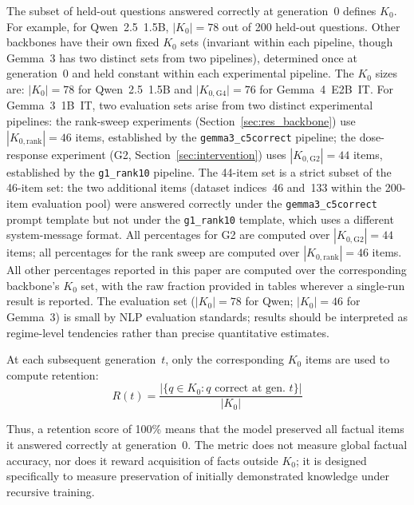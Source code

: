 \documentclass[a4paper,fleqn]{cas-dc}
\newif\ifshowchanges
\newcommand{\rev}[1]{\ifshowchanges{\color{blue}#1}\else{#1}\fi}
\newcommand{\Kcard}{\lvert K_0\rvert}
\newcommand{\KcardG}[1]{\lvert K_{0,\mathrm{#1}}\rvert}
\begin{document}
The subset of held-out questions answered correctly at generation~0 defines
$K_0$. For example, for Qwen~2.5~1.5B, $\Kcard=78$ out of 200 held-out
questions. Other backbones have their own fixed $K_0$ sets (invariant within each pipeline, though Gemma~3 has two distinct sets from two pipelines), determined once at
generation~0 and \rev{held constant within each experimental pipeline}.
\rev{The $K_0$ sizes are: $\Kcard=78$ for Qwen~2.5~1.5B and $\KcardG{G4}=76$ for
Gemma~4~E2B~IT. For Gemma~3~1B~IT, two evaluation sets arise from two distinct
experimental pipelines: the \rev{rank-sweep experiments}
(Section~\ref{sec:res_backbone}) use $|K_{0,\mathrm{rank}}|=46$ items, established
by the \texttt{gemma3\_c5correct} pipeline; the dose-response experiment (G2,
Section~\ref{sec:intervention}) uses $|K_{0,\mathrm{G2}}|=44$ items, established
by the \texttt{g1\_rank10} pipeline. The 44-item set is a strict subset of the
46-item set: the two additional items (dataset indices~46 and~133 within the
200-item evaluation pool) were answered correctly under the
\texttt{gemma3\_c5correct} prompt template but not under the \texttt{g1\_rank10}
template, which uses a different system-message format. All percentages for G2 are
computed over $|K_{0,\mathrm{G2}}|=44$ items; all percentages for the rank sweep
are computed over $|K_{0,\mathrm{rank}}|=46$ items. All other percentages reported
in this paper are computed over the corresponding backbone's $K_0$ set, with
the raw fraction provided in tables wherever a single-run result is reported.
\rev{The evaluation set ($|K_0|=78$ for Qwen; $|K_0|=46$ for Gemma~3) is small by
NLP evaluation standards; results should be interpreted as regime-level tendencies
rather than precise quantitative estimates.}}

At each subsequent generation~$t$, only the corresponding $K_0$ items are used
to compute retention:
\begin{equation}\label{eq:k0}
  \rev{R(t)} =
  \frac{|\{q \in K_0 : q \text{ correct at gen.\ } t\}|}{|K_0|}
\end{equation}

Thus, a retention score of 100\% means that the model preserved all factual
items it answered correctly at generation~0. The metric does not measure global
factual accuracy, nor does it reward acquisition of facts outside $K_0$; it is
designed specifically to measure preservation of initially demonstrated
knowledge under recursive training.
\end{document}
